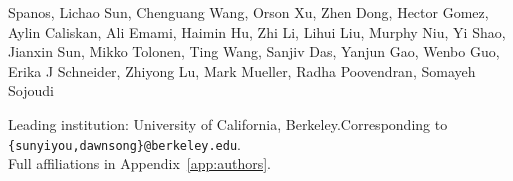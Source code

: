 {Spanos, Lichao Sun, Chenguang Wang, Orson Xu, Zhen Dong, Hector Gomez, Aylin Caliskan, Ali Emami, Haimin Hu, Zhi Li, Lihui Liu, Murphy Niu, Yi Shao, Jianxin Sun, Mikko Tolonen, Ting Wang, Sanjiv Das, Yanjun Gao, Wenbo Guo, Erika J Schneider, Zhiyong Lu, Mark Mueller, Radha Poovendran, Somayeh Sojoudi\par}
\vspace{16pt}

{\footnotesize Leading institution: University of California, Berkeley.\quad Corresponding to \texttt{\{sunyiyou,dawnsong\}@berkeley.edu}.\quad \\ Full affiliations in Appendix~\ref{app:authors}.}\par
\endgroup
